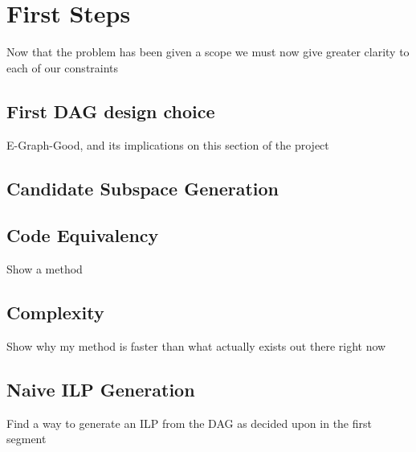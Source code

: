 \section{First Steps}

Now that the problem has been given a scope we must now give greater clarity to each of our constraints 
\medskip 

\subsection{ First DAG design choice}

E-Graph-Good, and its implications on this section of the project
\subsection{Candidate Subspace Generation}

\subsection{Code Equivalency}
Show a method
\subsection{Complexity}
Show why my method is faster than what actually exists out there right now
\subsection{Naive ILP Generation}

Find a way to generate an ILP from the DAG as decided upon in the first segment
